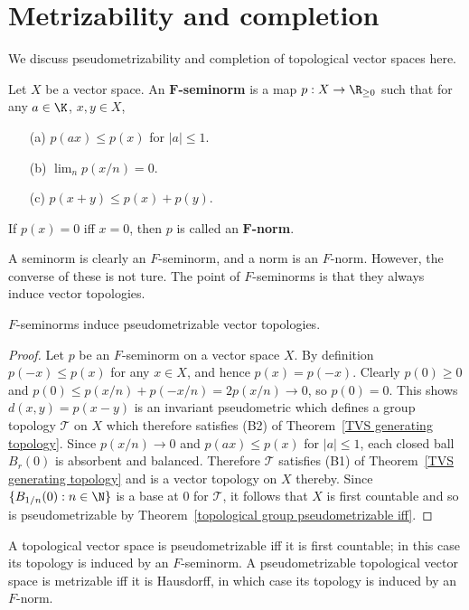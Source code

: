 \section{Metrizability and completion}
We discuss pseudometrizability and completion of topological vector spaces here.
\begin{definition}\label{F-seminorm def}
Let $X$ be a vector space. An \textbf{$\bm{F}$-seminorm} is a map $p:X\to\R_{\geq 0}$ such that for any $a\in\K$, $x,y\in X$,
\begin{itemize}
\item[(a)] $p(ax)\leq p(x)$ for $|a|\leq 1$.
\item[(b)] $\lim_np(x/n)=0$.
\item[(c)] $p(x+y)\leq p(x)+p(y)$.
\end{itemize}
If $p(x)=0$ iff $x=0$, then $p$ is called an \textbf{$\bm{F}$-norm}.
\end{definition}
A seminorm is clearly an $F$-seminorm, and a norm is an $F$-norm. However, the converse of these is not ture. The point of $F$-seminorms is that they always induce vector topologies.
\begin{theorem}
$F$-seminorms induce pseudometrizable vector topologies.
\end{theorem}
\begin{proof}
Let $p$ be an $F$-seminorm on a vector space $X$. By definition $p(-x)\leq p(x)$ for any $x\in X$, and hence $p(x)=p(-x)$. Clearly $p(0)\geq 0$ and $p(0)\leq p(x/n)+p(-x/n)=2p(x/n)\to 0$, so $p(0)=0$. This shows $d(x,y)=p(x-y)$ is an invariant pseudometric which defines a group topology $\mathcal{T}$ on $X$ which therefore satisfies (B2) of Theorem~\ref{TVS generating topology}. Since $p(x/n)\to 0$ and $p(ax)\leq p(x)$ for $|a|\leq 1$, each closed ball $B_r(0)$ is absorbent and balanced. Therefore $\mathcal{T}$ satisfies (B1) of Theorem~\ref{TVS generating topology} and is a vector topology on $X$ thereby. Since $\{B_{1/n}(0):n\in\N\}$ is a base at $0$ for $\mathcal{T}$, it follows that $X$ is first countable and so is pseudometrizable by Theorem~\ref{topological group pseudometrizable iff}.
\end{proof}
\begin{theorem}\label{TVS pseudometrizable}
A topological vector space is pseudometrizable iff it is first countable; in this case its topology is induced by an $F$-seminorm. A pseudometrizable topological vector space is metrizable iff it is Hausdorff, in which case its topology is induced by an $F$-norm.
\end{theorem}
